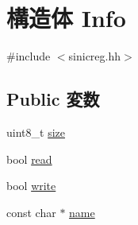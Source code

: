 \hypertarget{structSinic_1_1Regs_1_1Info}{
\section{構造体 Info}
\label{structSinic_1_1Regs_1_1Info}
}


{\ttfamily \#include $<$sinicreg.hh$>$}\subsection*{Public 変数}
\begin{DoxyCompactItemize}
\item 
uint8\_\-t \hyperlink{structSinic_1_1Regs_1_1Info_ae5dc6ffcd9b7605c7787791e40cc6bb0}{size}
\item 
bool \hyperlink{structSinic_1_1Regs_1_1Info_af49a80be54293d8b153cd2a3dfd4e068}{read}
\item 
bool \hyperlink{structSinic_1_1Regs_1_1Info_ab4d8d1259f524270d625ab8933700d27}{write}
\item 
const char $\ast$ \hyperlink{structSinic_1_1Regs_1_1Info_a8f8f80d37794cde9472343e4487ba3eb}{name}
\end{DoxyCompactItemize}


